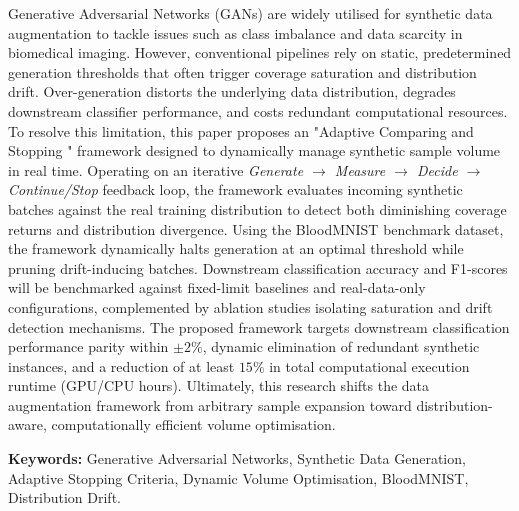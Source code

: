 \documentclass[12pt,a4paper]{report}
\begin{document}
\begin{justify}
Generative Adversarial Networks (GANs) are widely utilised for synthetic data augmentation to tackle issues such as class imbalance and data scarcity in biomedical imaging. However, conventional pipelines rely on static, predetermined generation thresholds that often trigger coverage saturation and distribution drift. Over-generation distorts the underlying data distribution, degrades downstream classifier performance, and costs redundant computational resources. To resolve this limitation, this paper proposes an "Adaptive Comparing and Stopping " framework designed to dynamically manage synthetic sample volume in real time. Operating on an iterative \textit{Generate $\rightarrow$ Measure $\rightarrow$ Decide $\rightarrow$ Continue/Stop} feedback loop, the framework evaluates incoming synthetic batches against the real training distribution to detect both diminishing coverage returns and distribution divergence. Using the BloodMNIST benchmark dataset, the framework dynamically halts generation at an optimal threshold while pruning drift-inducing batches. Downstream classification accuracy and F1-scores will be benchmarked against fixed-limit baselines and real-data-only configurations, complemented by ablation studies isolating saturation and drift detection mechanisms. The proposed framework targets downstream classification performance parity within $\pm 2\%$, dynamic elimination of redundant synthetic instances, and a reduction of at least $15\%$ in total computational execution runtime (GPU/CPU hours). Ultimately, this research shifts the data augmentation framework from arbitrary sample expansion toward distribution-aware, computationally efficient volume optimisation. 

\vspace{0.3cm}

\textbf{Keywords:} Generative Adversarial Networks, Synthetic Data Generation, Adaptive Stopping Criteria, Dynamic Volume Optimisation, BloodMNIST, Distribution Drift.
\end{justify}


\newpage
\tableofcontents
\end{document}

